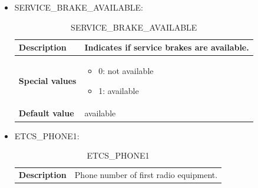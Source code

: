 \documentclass{template/openetcs}
\begin{document}
\begin{itemize}
\begin{longtable}{|l|l|}
				\hline
				
			\end{longtable}
			
		\item SERVICE\_BRAKE\_AVAILABLE:
								
			\begin{longtable}{|l|l|}
				\caption{SERVICE\_BRAKE\_AVAILABLE}\\ 
				\hline
				
					\begin{minipage}[t]{0.22\linewidth} \textbf{Description}	\end{minipage} 
				&	\begin{minipage}[t]{0.78\linewidth} Indicates if service brakes are available. \end{minipage} \\
				
				\hline
																																									
					\begin{minipage}[t]{0.22\linewidth} \textbf{Special values}	\end{minipage} 
				&	\begin{minipage}[t]{0.78\linewidth} \begin{itemize} \item 0: not available \item 1: available \end{itemize} \end{minipage} \\
				
				\hline
				
					\begin{minipage}[t]{0.22\linewidth} \textbf{Default value}	\end{minipage} 
				&	\begin{minipage}[t]{0.78\linewidth} available \end{minipage} \\
				
				\hline
				
			\end{longtable}
			
		\item ETCS\_PHONE1:
										
			\begin{longtable}{|l|l|}
				\caption{ETCS\_PHONE1}\\ 
				\hline
				
					\begin{minipage}[t]{0.22\linewidth} \textbf{Description}	\end{minipage} 
				&	\begin{minipage}[t]{0.78\linewidth} Phone number of first radio equipment. \end{minipage} \\
				

\end{longtable}
\end{itemize}
\end{document}
